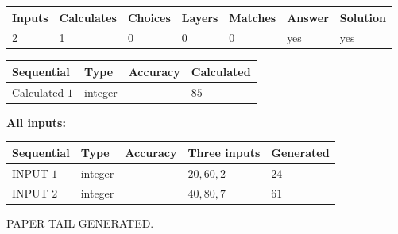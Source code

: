 \documentclass[12pt]{article}
\begin{document}
 
\noindent{}
 
 

 
   
   
   
   
\noindent\begin{tabular}{|l|l|l|l|l|l|l|}
 \hline
Inputs & Calculates & Choices & Layers & Matches & Answer & Solution \\ \hline
 2  & 
 1  & 
 0
  & 
 0  & 
 0  & 
  yes & 
  yes 
  \\ \hline
 \end{tabular}
   
   
   
   
\noindent{}
   
   
  
  
\noindent\begin{tabular}{|l|l|l|l|}
\hline
 Sequential & Type & Accuracy & Calculated \\ 
\hline
 
 
  Calculated $  1 $ & integer &  & 
  $ 85 $ 
 \\  \hline  
 \end{tabular}
   
   
   
   
\noindent\vspace{0.1in}\hspace{-0.08in} {\textbf{\Large{All inputs: }}}
   
   
  
  
\noindent\begin{tabular}{|l|l|l|l|l|}
\hline
 Sequential & Type & Accuracy & Three inputs & Generated \\ 
\hline
 
 
  INPUT $  1 $ & integer &  & $
 20
 , 
 60
 , 
 2
 $ & $ 24 $ 
 \\  \hline  
 
 
  INPUT $  2 $ & integer &  & $
 40
 , 
 80
 , 
 7
 $ & $ 61 $ 
 \\  \hline  
 \end{tabular}
   
   
   
   
   
   
 \vspace{0.2in}
 
   
   
\vspace{2.0in} PAPER TAIL GENERATED.
   
\end{document}
